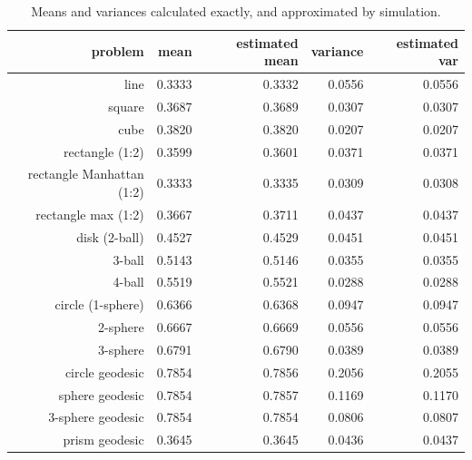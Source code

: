 \begin{table}[ht]
  \centering
  \begin{tabular}{r|rrrr}
                  problem &     mean & estimated mean & variance &  estimated var \\
     \hline 
                     line &   0.3333 &         0.3332 &   0.0556 &         0.0556 \\
                   square &   0.3687 &         0.3689 &   0.0307 &         0.0307 \\
                     cube &   0.3820 &         0.3820 &   0.0207 &         0.0207 \\
          rectangle (1:2) &   0.3599 &         0.3601 &   0.0371 &         0.0371 \\
rectangle Manhattan (1:2) &   0.3333 &         0.3335 &   0.0309 &         0.0308 \\
      rectangle max (1:2) &   0.3667 &         0.3711 &   0.0437 &         0.0437 \\
            disk (2-ball) &   0.4527 &         0.4529 &   0.0451 &         0.0451 \\
                   3-ball &   0.5143 &         0.5146 &   0.0355 &         0.0355 \\
                   4-ball &   0.5519 &         0.5521 &   0.0288 &         0.0288 \\
        circle (1-sphere) &   0.6366 &         0.6368 &   0.0947 &         0.0947 \\
                 2-sphere &   0.6667 &         0.6669 &   0.0556 &         0.0556 \\
                 3-sphere &   0.6791 &         0.6790 &   0.0389 &         0.0389 \\
          circle geodesic &   0.7854 &         0.7856 &   0.2056 &         0.2055 \\
          sphere geodesic &   0.7854 &         0.7857 &   0.1169 &         0.1170 \\
        3-sphere geodesic &   0.7854 &         0.7854 &   0.0806 &         0.0807 \\
           prism geodesic &   0.3645 &         0.3645 &   0.0436 &         0.0437 \\
  \end{tabular}
  \caption{Means and variances calculated exactly, and approximated by simulation.}
  \label{tab:mean_var_estimates}
\end{table}






